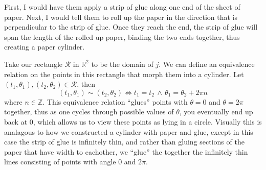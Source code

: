 \documentclass[12pt]{article}
\newcommand{\Z}{\mathbb{Z}}
\newcommand{\R}{\mathbb{R}}
\begin{document}
\pagestyle{fancy}
\fancyhead{}

\normalsize

\noindent
First, I would have them apply a strip of glue along one end of the sheet of paper. Next, I would tell them to roll up the paper in the direction that is perpendicular to the strip of glue. Once they reach the end, the strip of glue will span the length of the rolled up paper, binding the two ends together, thus creating a paper cylinder.

\noindent
Take our rectangle $\mathcal{R}$ in $\R^2$ to be the domain of $j$. We can define an equivalence relation on the points in this rectangle that morph them into a cylinder. Let $(t_1,\theta_1),(t_2,\theta_2)\in\mathcal{R}$, then
\[(t_1,\theta_1)\sim(t_2,\theta_2)\iff t_1=t_2\,\land\,\theta_1=\theta_2+2\pi n\]
where $n\in\Z$. This equivalence relation ``glues'' points with $\theta=0$ and $\theta=2\pi$ together, thus as one cycles through possible values of $\theta$, you eventually end up back at 0, which allows us to view these points as lying in a circle. Visually this is analagous to how we constructed a cylinder with paper and glue, except in this case the strip of glue is infinitely thin, and rather than gluing sections of the paper that have width to eachother, we ``glue'' the together the infinitely thin lines consisting of points with angle $0$ and $2\pi$.
\end{document}
